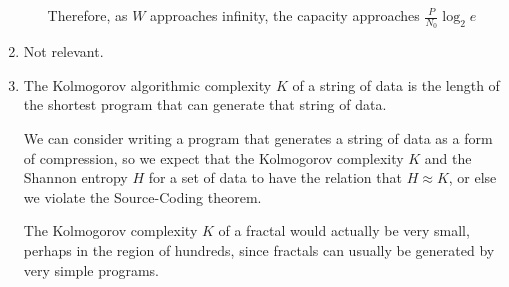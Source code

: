 \begin{enumerate}[label=(\alph*)]
\begin{enumerate}[label=(\roman*)]
      Therefore, as $W$ approaches infinity, the capacity approaches $\frac{P}{N_0}\log_2 e$



    \end{enumerate}

  \item
    Not relevant.

  \item
    The Kolmogorov algorithmic complexity $K$ of a string of data is the length of the shortest program that can generate that string of data.

    We can consider writing a program that generates a string of data as a form of compression, so we expect that the Kolmogorov complexity $K$ and the Shannon entropy $H$ for a set of data to have the relation that $H \approx K$, or else we violate the Source-Coding theorem.

    The Kolmogorov complexity $K$ of a fractal would actually be very small, perhaps in the region of hundreds, since fractals can usually be generated by very simple programs.
        
\end{enumerate}

